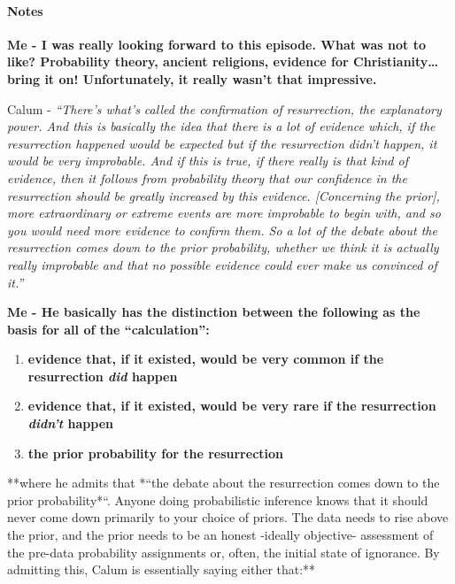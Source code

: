 \paragraph{Notes}\label{notes}

\textbf{Me - I was really looking forward to this episode. What was not
to like? Probability theory, ancient religions, evidence for
Christianity\ldots{}bring it on! Unfortunately, it really wasn't that
impressive.}

Calum - \emph{``There's what's called the confirmation of resurrection,
the explanatory power. And this is basically the idea that there is a
lot of evidence which, if the resurrection happened would be expected
but if the resurrection didn't happen, it would be very improbable. And
if this is true, if there really is that kind of evidence, then it
follows from probability theory that our confidence in the resurrection
should be greatly increased by this evidence. {[}Concerning the
prior{]}, more extraordinary or extreme events are more improbable to
begin with, and so you would need more evidence to confirm them. So a
lot of the debate about the resurrection comes down to the prior
probability, whether we think it is actually really improbable and that
no possible evidence could ever make us convinced of it.''}

\textbf{Me - He basically has the distinction between the following as
the basis for all of the ``calculation'':}

\begin{enumerate}
\def\labelenumi{\arabic{enumi}.}
\itemsep1pt\parskip0pt
\item
  \textbf{evidence that, if it existed, would be very common if the
  resurrection \emph{did} happen}
\item
  \textbf{evidence that, if it existed, would be very rare if the
  resurrection \emph{didn't} happen}
\item
  \textbf{the prior probability for the resurrection}
\end{enumerate}

**where he admits that *``the debate about the resurrection comes down
to the prior probability*``. Anyone doing probabilistic inference knows
that it should never come down primarily to your choice of priors. The
data needs to rise above the prior, and the prior needs to be an honest
-ideally objective- assessment of the pre-data probability assignments
or, often, the initial state of ignorance. By admitting this, Calum is
essentially saying either that:**

